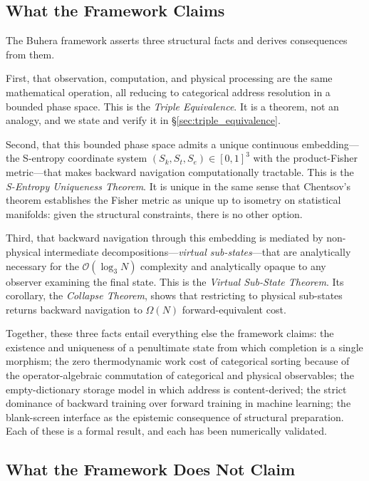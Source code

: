 \documentclass[twocolumn,11pt,a4paper]{article}
\begin{document}
\subsection{What the Framework Claims}

The Buhera framework asserts three structural facts and derives consequences from them.

First, that observation, computation, and physical processing are the same mathematical operation, all reducing to categorical address resolution in a bounded phase space. This is the \emph{Triple Equivalence}. It is a theorem, not an analogy, and we state and verify it in \S\ref{sec:triple_equivalence}.

Second, that this bounded phase space admits a unique continuous embedding---the S-entropy coordinate system $(S_k, S_t, S_e) \in [0,1]^3$ with the product-Fisher metric---that makes backward navigation computationally tractable. This is the \emph{S-Entropy Uniqueness Theorem}. It is unique in the same sense that Chentsov's theorem \cite{chentsov1972statistical} establishes the Fisher metric as unique up to isometry on statistical manifolds: given the structural constraints, there is no other option.

Third, that backward navigation through this embedding is mediated by non-physical intermediate decompositions---\emph{virtual sub-states}---that are analytically necessary for the $\mathcal{O}(\log_3 N)$ complexity and analytically opaque to any observer examining the final state. This is the \emph{Virtual Sub-State Theorem}. Its corollary, the \emph{Collapse Theorem}, shows that restricting to physical sub-states returns backward navigation to $\Omega(N)$ forward-equivalent cost.

Together, these three facts entail everything else the framework claims: the existence and uniqueness of a penultimate state from which completion is a single morphism; the zero thermodynamic work cost of categorical sorting because of the operator-algebraic commutation of categorical and physical observables; the empty-dictionary storage model in which address is content-derived; the strict dominance of backward training over forward training in machine learning; the blank-screen interface as the epistemic consequence of structural preparation. Each of these is a formal result, and each has been numerically validated.

\subsection{What the Framework Does Not Claim}
\end{document}
